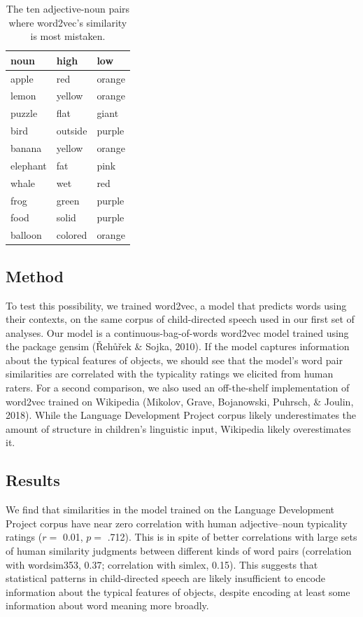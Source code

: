 \documentclass[10pt, letterpaper]{article}
\begin{document}
\begin{table}[tb]
\centering
\begin{tabular}{lll}
  \hline
noun & high & low \\ 
  \hline
apple & red & orange \\ 
  lemon & yellow & orange \\ 
  puzzle & flat & giant \\ 
  bird & outside & purple \\ 
  banana & yellow & orange \\ 
  elephant & fat & pink \\ 
  whale & wet & red \\ 
  frog & green & purple \\ 
  food & solid & purple \\ 
  balloon & colored & orange \\ 
   \hline
\end{tabular}
\caption{The ten adjective-noun pairs where word2vec's similarity is most mistaken.} 
\label{tab:model_errors}
\end{table}

\hypertarget{method}{%
\subsection{Method}\label{method}}

To test this possibility, we trained word2vec, a model that predicts
words using their contexts, on the same corpus of child-directed speech
used in our first set of analyses. Our model is a
continuous-bag-of-words word2vec model trained using the package gensim
(Řehůřek \& Sojka, 2010). If the model captures information about the
typical features of objects, we should see that the model's word pair
similarities are correlated with the typicality ratings we elicited from
human raters. For a second comparison, we also used an off-the-shelf
implementation of word2vec trained on Wikipedia (Mikolov, Grave,
Bojanowski, Puhrsch, \& Joulin, 2018). While the Language Development
Project corpus likely underestimates the amount of structure in
children's linguistic input, Wikipedia likely overestimates it.

\hypertarget{results-1}{%
\subsection{Results}\label{results-1}}

We find that similarities in the model trained on the Language
Development Project corpus have near zero correlation with human
adjective--noun typicality ratings (\(r =\) 0.01, \(p =\) .712). This is
in spite of better correlations with large sets of human similarity
judgments between different kinds of word pairs (correlation with
wordsim353, 0.37; correlation with simlex, 0.15). This suggests that
statistical patterns in child-directed speech are likely insufficient to
encode information about the typical features of objects, despite
encoding at least some information about word meaning more broadly.
\end{document}

